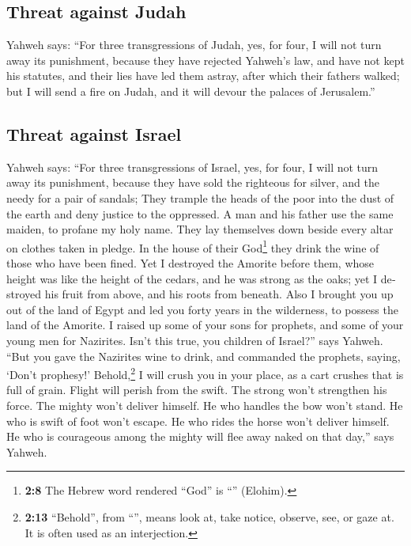 \begin{paracol}{2}
\begin{otherlanguage}{english}
\hypertarget{threat-against-judah}{%
\subsection{Threat against Judah}\label{threat-against-judah}}

 Yahweh says: ``For three transgressions of Judah, yes,
for four, I will not turn away its punishment, because they have
rejected Yahweh's law, and have not kept his statutes, and their lies
have led them astray, after which their fathers walked; 
but I will send a fire on Judah, and it will devour the palaces of
Jerusalem.''

\hypertarget{threat-against-israel}{%
\subsection{Threat against Israel}\label{threat-against-israel}}

 Yahweh says: ``For three transgressions of Israel, yes,
for four, I will not turn away its punishment, because they have sold
the righteous for silver, and the needy for a pair of sandals;
 They trample the heads of the poor into the dust of the
earth and deny justice to the oppressed. A man and his father use the
same maiden, to profane my holy name.  They lay themselves
down beside every altar on clothes taken in pledge. In the house of
their God\footnote{\textbf{2:8} The Hebrew word rendered ``God'' is
  ``'' (Elohim).} they drink the wine of those who have
been fined.  Yet I destroyed the Amorite before them,
whose height was like the height of the cedars, and he was strong as the
oaks; yet I destroyed his fruit from above, and his roots from beneath.
 Also I brought you up out of the land of Egypt and led
you forty years in the wilderness, to possess the land of the Amorite.
 I raised up some of your sons for prophets, and some of
your young men for Nazirites. Isn't this true, you children of Israel?''
says Yahweh.  ``But you gave the Nazirites wine to drink,
and commanded the prophets, saying, `Don't prophesy!' 
Behold,\footnote{\textbf{2:13} ``Behold'', from ``'', means
  look at, take notice, observe, see, or gaze at. It is often used as an
  interjection.} I will crush you in your place, as a cart crushes that
is full of grain.  Flight will perish from the swift. The
strong won't strengthen his force. The mighty won't deliver himself.
 He who handles the bow won't stand. He who is swift of
foot won't escape. He who rides the horse won't deliver himself.
 He who is courageous among the mighty will flee away
naked on that day,'' says Yahweh.


\end{otherlanguage}
\end{paracol}
